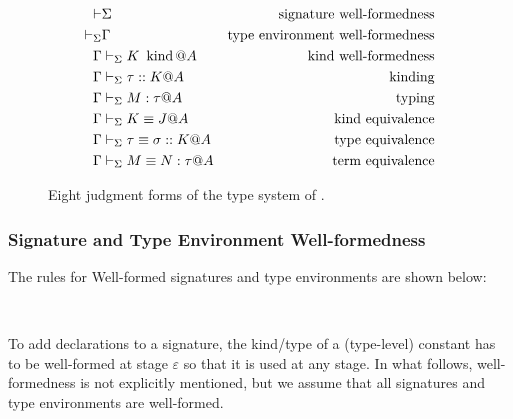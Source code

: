 \begin{figure}[tbp]
    \begin{center}
    \begin{align*}
      \vdash & \Sigma                     & \text{signature well-formedness}        \\
      \vdash_\Sigma     & \Gamma                         & \text{type environment well-formedness} \\
      \Gamma     & \vdash_\Sigma K \operatorname{\ kind} @ A           & \text{kind well-formedness}             \\
      \Gamma     & \vdash_\Sigma \tau :: K @ A           & \text{kinding}                          \\
      \Gamma     & \vdash_\Sigma M : \tau @ A            & \text{typing}                           \\
      \Gamma     & \vdash_\Sigma K \equiv J @ A              & \text{kind equivalence}                 \\
      \Gamma     & \vdash_\Sigma \tau \equiv \sigma :: K @ A & \text{type equivalence}                 \\
      \Gamma     & \vdash_\Sigma M \equiv N : \tau @ A       & \text{term equivalence}
    \end{align*}
    \caption{Eight judgment forms of the type system of \LMD.}
    \label{fig:LMD-six-judgments}
  \end{center}
\end{figure}

\subsubsection{Signature and Type Environment Well-formedness}
The rules for Well-formed signatures and type environments are
shown below:
%
{
\begin{center}
  \infrule{
  }{
    \vdash \emptyset
  }
  \hfil
  \hfil
  \\[2mm]
  \infrule{
  }{
    \V \emptyset
  }
  \hfil
\end{center}
}

To add declarations to a signature, the kind/type of a (type-level) constant
has to be well-formed at stage \(\varepsilon\) so that it is used at any stage.
In what follows, well-formedness is not explicitly mentioned, but we assume
that all signatures and type environments are well-formed.

